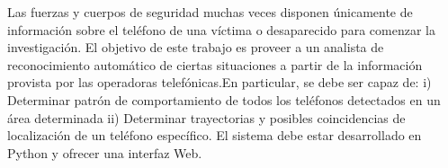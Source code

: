 Las fuerzas y cuerpos de seguridad muchas veces disponen únicamente de información sobre el teléfono de una víctima o desaparecido para comenzar la investigación. El objetivo de este trabajo es proveer a un analista de reconocimiento automático de ciertas situaciones a partir de la información provista por las operadoras telefónicas.En particular, se debe ser capaz de:
i) Determinar patrón de comportamiento de todos los teléfonos detectados en un área determinada
ii) Determinar trayectorias y posibles coincidencias de localización de un teléfono específico. El sistema debe estar desarrollado en Python y ofrecer una interfaz Web.